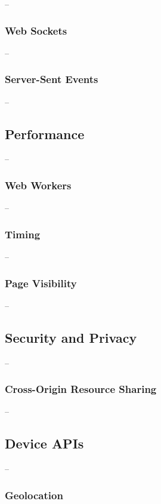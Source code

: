 --

\subsubsection{Web Sockets}

--

\subsubsection{Server-Sent Events}

--

\subsection{Performance}

--

\subsubsection{Web Workers}

--

\subsubsection{Timing}

--

\subsubsection{Page Visibility}

--

\subsection{Security and Privacy}

--

\subsubsection{Cross-Origin Resource Sharing}

--

\subsection{Device APIs}

--

\subsubsection{Geolocation}

